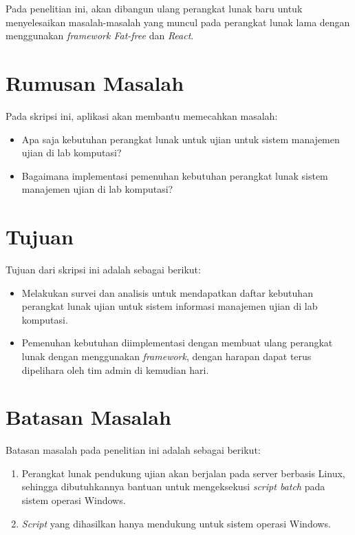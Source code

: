 Pada penelitian ini, akan dibangun ulang perangkat lunak baru untuk
menyelesaikan masalah-masalah yang muncul pada perangkat lunak lama dengan
menggunakan \textit{framework Fat-free} dan \textit{React}.

\section{Rumusan Masalah}
\label{sec:rumusan}
Pada skripsi ini, aplikasi akan membantu memecahkan masalah:
\begin{itemize}
    \item Apa saja kebutuhan perangkat lunak untuk ujian untuk sistem manajemen
    ujian di lab komputasi?
    
    \item Bagaimana implementasi pemenuhan kebutuhan perangkat lunak sistem
    manajemen ujian di lab komputasi?
\end{itemize}

\section{Tujuan}
\label{sec:tujuan}
Tujuan dari skripsi ini adalah sebagai berikut:
\begin{itemize}
    \item Melakukan survei dan analisis untuk mendapatkan daftar kebutuhan
        perangkat lunak ujian untuk sistem informasi manajemen ujian di lab
        komputasi.

    \item Pemenuhan kebutuhan diimplementasi dengan membuat ulang perangkat
        lunak dengan menggunakan \textit{framework}, dengan harapan dapat terus
        dipelihara oleh tim admin di kemudian hari.

\end{itemize}

\section{Batasan Masalah}
\label{sec:batasan}
Batasan masalah pada penelitian ini adalah sebagai berikut:
\begin{enumerate}
    \item Perangkat lunak pendukung ujian akan berjalan pada server berbasis Linux,
        sehingga dibutuhkannya bantuan untuk mengeksekusi \textit{script batch}
        pada sistem operasi Windows.
        
    \item \textit{Script} yang dihasilkan hanya mendukung untuk sistem operasi Windows.
\end{enumerate}

